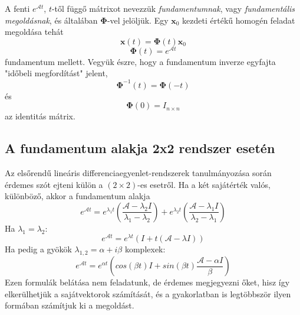 \documentclass[14p]{article}
\begin{document}
A fenti $e^{\mathcal{A}t}$, $t$-től függő mátrixot nevezzük \emph{fundamentumnak}, vagy \emph{fundamentális megoldásnak}, és általában $\mathbf{\Phi}$-vel jelöljük.
Egy $\pmb{x}_0$ kezdeti értékű homogén feladat megoldása tehát
\[
	\pmb{x}(t) = \mathbf{\Phi}(t) \pmb{x}_0
\]
\[
	\mathbf{\Phi}(t) = e^{\mathcal{A}t}
\]
fundamentum mellett. Vegyük észre, hogy a fundamentum inverze egyfajta "időbeli megfordítást" jelent,
\[
	\mathbf{\Phi}^{-1}(t) = \mathbf{\Phi}(-t)
\]
és
\[
	\mathbf{\Phi}(0) = I_{n \times n}
\]
az identitás mátrix.
\subsection{A fundamentum alakja 2x2 rendszer esetén}
Az elsőrendű lineáris differenciaegyenlet-rendszerek tanulmányozása során érdemes szót ejteni külön a $(2 \times 2)$-es esetről. Ha a két sajátérték valós, különböző, akkor a fundamentum alakja
\[
	e^{\mathcal{A}t} = e^{\lambda_1 t}\left(\frac{\mathcal{A}-\lambda_2 I}{\lambda_1 - \lambda_2}\right) + e^{\lambda_2 t}\left(\frac{\mathcal{A}-\lambda_1 I}{\lambda_2 - \lambda_1}\right)
\]
Ha $\lambda_1 = \lambda_2$:
\[
	e^{\mathcal{A}t} = e^{\lambda t}(I + t(\mathcal{A}-\lambda I))
\]
Ha pedig a gyökök $\lambda_{1,2} = \alpha + i\beta$ komplexek:
\[
	e^{\mathcal{A} t} = e^{\alpha t}\left( cos(\beta t)I + sin(\beta t) \frac{\mathcal{A} - \alpha I}{\beta} \right)
\]
Ezen formulák belátása nem feladatunk, de érdemes megjegyezni őket, hisz így elkerülhetjük a sajátvektorok számítását, és a gyakorlatban is legtöbbször ilyen formában számítjuk ki a megoldást. 
\end{document}

